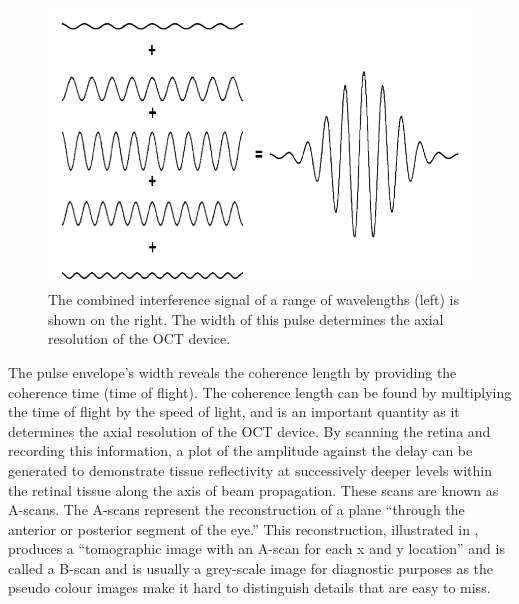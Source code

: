 \begin{figure}[htbp]
\centering
\includegraphics{figures/morgan_2}
\caption{The combined interference signal of a range of wavelengths (left) is 
shown on the right.  The width of this pulse determines the axial resolution of 
the OCT device. \cite{mbib_6} }
\label{fig:m_2}
\end{figure}

The pulse envelope’s width reveals the coherence length by providing
the coherence time (time of flight).  The coherence length can be found
by multiplying the time of flight by the speed of light, and is an
important quantity as it determines the axial resolution of the OCT
device. \cite{mbib_6}  By scanning the retina and recording this
information, a plot of the amplitude against the delay can be generated to
demonstrate tissue reflectivity at successively deeper levels within the
retinal tissue along the axis of beam propagation. \cite{mbib_6}
These scans are known as A-scans.  The A-scans represent the reconstruction
of a plane “through the anterior or posterior segment of the eye.”\cite{mbib_6}
This reconstruction, illustrated in , produces a “tomographic
image with an A-scan for each x and y location” and is called a B-scan and is
usually a grey-scale image for diagnostic purposes as the pseudo colour images
make it hard to distinguish details that are easy to miss. \cite{mbib_5,mbib_4,mbib_7}


